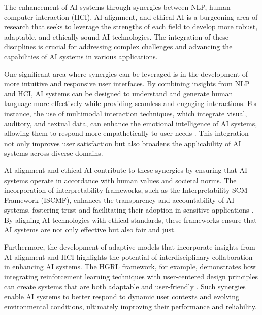The enhancement of AI systems through synergies between NLP, human-computer interaction (HCI), AI alignment, and ethical AI is a burgeoning area of research that seeks to leverage the strengths of each field to develop more robust, adaptable, and ethically sound AI technologies. The integration of these disciplines is crucial for addressing complex challenges and advancing the capabilities of AI systems in various applications.



One significant area where synergies can be leveraged is in the development of more intuitive and responsive user interfaces. By combining insights from NLP and HCI, AI systems can be designed to understand and generate human language more effectively while providing seamless and engaging interactions. For instance, the use of multimodal interaction techniques, which integrate visual, auditory, and textual data, can enhance the emotional intelligence of AI systems, allowing them to respond more empathetically to user needs \cite{zhou2023leveragingtcntransformereffective}. This integration not only improves user satisfaction but also broadens the applicability of AI systems across diverse domains.



AI alignment and ethical AI contribute to these synergies by ensuring that AI systems operate in accordance with human values and societal norms. The incorporation of interpretability frameworks, such as the Interpretability SCM Framework (ISCMF), enhances the transparency and accountability of AI systems, fostering trust and facilitating their adoption in sensitive applications \cite{lin2023interpretabilityframeworksimilarcase}. By aligning AI technologies with ethical standards, these frameworks ensure that AI systems are not only effective but also fair and just.



Furthermore, the development of adaptive models that incorporate insights from AI alignment and HCI highlights the potential of interdisciplinary collaboration in enhancing AI systems. The HGRL framework, for example, demonstrates how integrating reinforcement learning techniques with user-centered design principles can create systems that are both adaptable and user-friendly \cite{chen2024adaptivenetworkinterventioncomplex}. Such synergies enable AI systems to better respond to dynamic user contexts and evolving environmental conditions, ultimately improving their performance and reliability.



